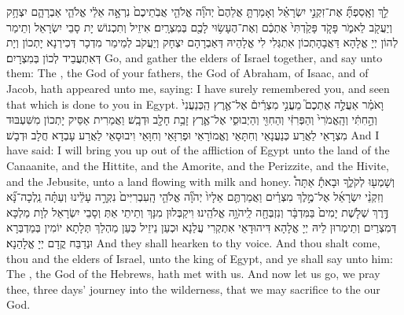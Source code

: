 {לֵ֣ךְ וְאָֽסַפְתָּ֞ אֶת־זִקְנֵ֣י יִשְׂרָאֵ֗ל וְאָמַרְתָּ֤ אֲלֵהֶם֙ יְהֹוָ֞ה אֱלֹהֵ֤י אֲבֹֽתֵיכֶם֙ נִרְאָ֣ה אֵלַ֔י אֱלֹהֵ֧י אַבְרָהָ֛ם יִצְחָ֥ק וְיַעֲקֹ֖ב לֵאמֹ֑ר פָּקֹ֤ד פָּקַ֙דְתִּי֙ אֶתְכֶ֔ם וְאֶת־הֶעָשׂ֥וּי לָכֶ֖ם בְּמִצְרָֽיִם׃
}
{אִיזֵיל וְתִכְנוֹשׁ יָת סָבֵי יִשְׂרָאֵל וְתֵימַר לְהוֹן יְיָ אֱלָהָא דַּאֲבָהָתְכוֹן אִתְגְּלִי לִי אֱלָהֵיהּ דְּאַבְרָהָם יִצְחָק וְיַעֲקֹב לְמֵימַר מִדְכָר דְּכִירְנָא יָתְכוֹן וְיָת דְּאִתְעֲבֵיד לְכוֹן בְּמִצְרָיִם׃}
{Go, and gather the elders of Israel together, and say unto them: The \lord, the God of your fathers, the God of Abraham, of Isaac, and of Jacob, hath appeared unto me, saying: I have surely remembered you, and seen that which is done to you in Egypt.}{}
{וָאֹמַ֗ר אַעֲלֶ֣ה אֶתְכֶם֮ מֵעֳנִ֣י מִצְרַ֒יִם֒ אֶל־אֶ֤רֶץ הַֽכְּנַעֲנִי֙ וְהַ֣חִתִּ֔י וְהָֽאֱמֹרִי֙ וְהַפְּרִזִּ֔י וְהַחִוִּ֖י וְהַיְבוּסִ֑י אֶל־אֶ֛רֶץ זָבַ֥ת חָלָ֖ב וּדְבָֽשׁ׃}
{וַאֲמַרִית אַסֵּיק יָתְכוֹן מִשִּׁעְבּוּד מִצְרָאֵי לַאֲרַע כְּנַעֲנָאֵי וְחִתָּאֵי וֶאֱמוֹרָאֵי וּפְרִזָּאֵי וְחִוָּאֵי וִיבוּסָאֵי לַאֲרַע עָבְדָא חֲלָב וּדְבָשׁ׃}
{And I have said: I will bring you up out of the affliction of Egypt unto the land of the Canaanite, and the Hittite, and the Amorite, and the Perizzite, and the Hivite, and the Jebusite, unto a land flowing with milk and honey.}{}
{וְשָׁמְע֖וּ לְקֹלֶ֑ךָ וּבָאתָ֡ אַתָּה֩ וְזִקְנֵ֨י יִשְׂרָאֵ֜ל אֶל־מֶ֣לֶךְ מִצְרַ֗יִם וַאֲמַרְתֶּ֤ם אֵלָיו֙ יְהֹוָ֞ה אֱלֹהֵ֤י הָֽעִבְרִיִּים֙ נִקְרָ֣ה עָלֵ֔ינוּ וְעַתָּ֗ה נֵֽלְכָה־נָּ֞א דֶּ֣רֶךְ שְׁלֹ֤שֶׁת יָמִים֙ בַּמִּדְבָּ֔ר וְנִזְבְּחָ֖ה לַֽיהֹוָ֥ה אֱלֹהֵֽינוּ׃
}
{וִיקַבְּלוּן מִנָּךְ וְתֵיתֵי אַתְּ וְסָבֵי יִשְׂרָאֵל לְוָת מַלְכָּא דְּמִצְרַיִם וְתֵימְרוּן לֵיהּ יְיָ אֱלָהָא דִּיהוּדָאֵי אִתְקְרִי עֲלַנָא וּכְעַן נֵיזֵיל כְּעַן מַהְלַךְ תְּלָתָא יוֹמִין בְּמַדְבְּרָא וּנְדַבַּח קֳדָם יְיָ אֱלָהַנָא׃}
{And they shall hearken to thy voice. And thou shalt come, thou and the elders of Israel, unto the king of Egypt, and ye shall say unto him: The \lord, the God of the Hebrews, hath met with us. And now let us go, we pray thee, three days’ journey into the wilderness, that we may sacrifice to the \lord\space our God.}{}
